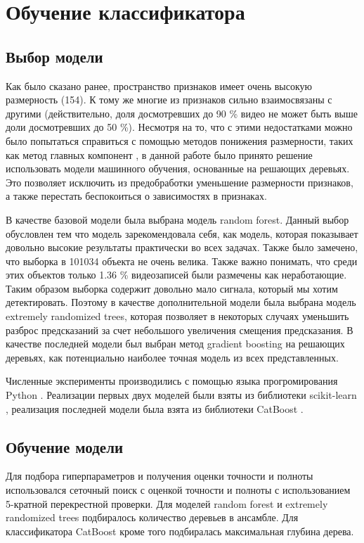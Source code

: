 \chapter{Обучение классификатора}

\section{Выбор модели}

Как было сказано ранее, пространство признаков имеет очень высокую размерность (154). К тому же многие из признаков сильно взаимосвязаны с другими (действительно, доля досмотревших до 90 \% видео не может быть выше доли досмотревших до 50 \%). Несмотря на то, что с этими недостатками можно было попытаться справиться с помощью методов понижения размерности, таких как метод главных компонент \cite{Pearson1901}, в данной работе было принято решение использовать модели машинного обучения, основанные на решающих деревьях. Это позволяет исключить из предобработки уменьшение размерности признаков, а также перестать беспокоиться о зависимостях в признаках.

В качестве базовой модели была выбрана модель random forest. Данный выбор обусловлен тем что модель зарекомендовала себя, как модель, которая показывает довольно высокие результаты практически во всех задачах. Также было замечено, что выборка в 101034 объекта не очень велика. Также важно понимать, что среди этих объектов только 1.36 \% видеозаписей были размечены как неработающие. Таким образом выборка содержит довольно мало сигнала, который мы хотим детектировать. Поэтому в качестве дополнительной модели была выбрана модель extremely randomized trees, которая позволяет в некоторых случаях уменьшить разброс предсказаний за счет небольшого увеличения смещения предсказания. В качестве последней модели был выбран метод gradient boosting на решающих деревьях, как потенциально наиболее точная модель из всех представленных.

Численные эксперименты производились с помощью языка прогромирования Python \cite{Python}. Реализации первых двух моделей были взяты из библиотеки scikit-learn \cite{scikit-learn}, реализация последней модели была взята из библиотеки CatBoost \cite{Prokhorenkova2017}.

\section{Обучение модели}

Для подбора гиперпараметров и получения оценки точности и полноты использовался сеточный поиск с оценкой точности и полноты с использованием 5-кратной перекрестной проверки. Для моделей random forest и extremely randomized trees подбиралось количество деревьев в ансамбле. Для классификатора CatBoost кроме того подбиралась максимальная глубина дерева.

